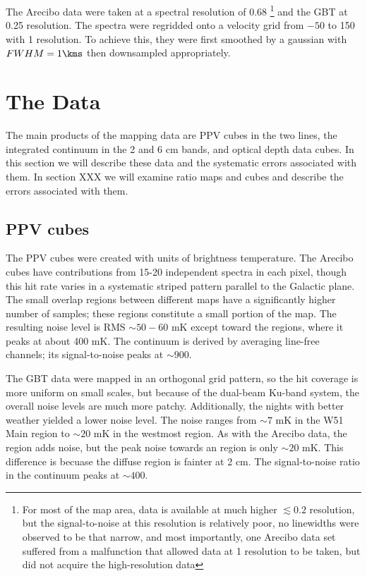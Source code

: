 The Arecibo data were taken at a spectral resolution of 0.68 \kms\footnote{For
most of the map area, data is available at much higher $\lesssim0.2$ \kms
resolution, but the signal-to-noise at this resolution is relatively poor, no
linewidths were observed to be that narrow, and most importantly, one Arecibo
data set suffered from a malfunction that allowed data at 1 \kms resolution to
be taken, but did not acquire the high-resolution data} and the GBT at 0.25
\kms resolution.  The spectra were regridded onto a velocity grid from $-50$ to
150 \kms with 1 \kms resolution.  To achieve this, they were first smoothed by
a gaussian with $FWHM=1 \kms$ then downsampled appropriately.

\section{The Data}

The main products of the mapping data are PPV cubes in the two \formaldehyde
lines, the integrated continuum in the 2 and 6 cm bands, and optical depth data
cubes.  In this section we will describe these data and the systematic errors
associated with them.  In section XXX we will examine ratio maps and cubes and
describe the errors associated with them.

\subsection{PPV cubes}
The PPV cubes were created with units of brightness temperature.  The Arecibo
cubes have contributions from 15-20 independent spectra in each pixel, though
this hit rate varies in a systematic striped pattern parallel to the Galactic
plane.  The small overlap regions between different maps have a significantly
higher number of samples; these regions constitute a small portion of the map.
The resulting noise level is RMS $\sim 50-60$ mK except toward the \hii
regions, where it peaks at about 400 mK.  The continuum is derived by averaging
line-free channels; its signal-to-noise peaks at $\sim900$.

The GBT data were mapped in an orthogonal grid pattern, so the hit coverage is
more uniform on small scales, but because of the dual-beam Ku-band system, the
overall noise levels are much more patchy.  Additionally, the nights with
better weather yielded a lower noise level.  The noise ranges from $\sim7$ mK
in the W51 Main region to $\sim 20$ mK in the westmost region.  As with the
Arecibo data, the \hii region adds noise, but the peak noise towards an \hii
region is only $\sim 20$ mK.  This difference is becuase the diffuse \hii
region is fainter at 2 cm.  The signal-to-noise ratio in the continuum peaks at
$\sim 400$.

